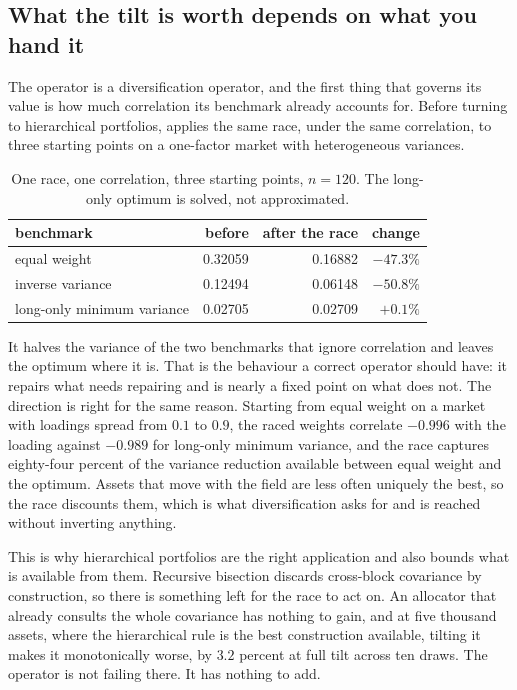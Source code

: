 \documentclass[11pt]{article}
\begin{document}
\subsection{What the tilt is worth depends on what you hand it}
\label{sec:benchmark}

The operator is a diversification operator, and the first thing that governs
its value is how much correlation its benchmark already accounts for. Before
turning to hierarchical portfolios,  applies the same race,
under the same correlation, to three starting points on a one-factor market
with heterogeneous variances.

\begin{table}[ht]
\centering
\begin{tabular}{lrrr}
\toprule
benchmark & before & after the race & change \\
\midrule
equal weight & 0.32059 & 0.16882 & $-47.3\%$ \\
inverse variance & 0.12494 & 0.06148 & $-50.8\%$ \\
long-only minimum variance & 0.02705 & 0.02709 & $+0.1\%$ \\
\bottomrule
\end{tabular}
\caption{One race, one correlation, three starting points, $n=120$. The
long-only optimum is solved, not approximated.}
\label{tab:benchmark}
\end{table}

It halves the variance of the two benchmarks that ignore correlation and
leaves the optimum where it is. That is the behaviour a correct operator
should have: it repairs what needs repairing and is nearly a fixed point on
what does not. The direction is right for the same reason. Starting from equal
weight on a market with loadings spread from $0.1$ to $0.9$, the raced weights
correlate $-0.996$ with the loading against $-0.989$ for long-only minimum
variance, and the race captures eighty-four percent of the variance reduction
available between equal weight and the optimum. Assets that move with the
field are less often uniquely the best, so the race discounts them, which is
what diversification asks for and is reached without inverting anything.

This is why hierarchical portfolios are the right application and also bounds
what is available from them. Recursive bisection discards cross-block
covariance by construction, so there is something left for the race to act on.
An allocator that already consults the whole covariance has nothing to gain,
and at five thousand assets, where the hierarchical rule is the best
construction available, tilting it makes it monotonically worse, by $3.2$
percent at full tilt across ten draws. The operator is not failing there. It
has nothing to add.
\end{document}
